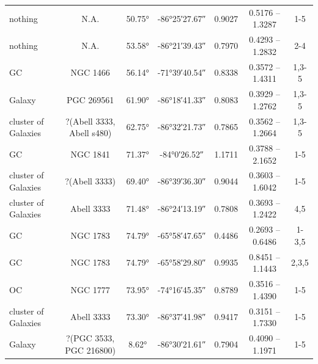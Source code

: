 \begin{longtable}{l c c c c c c}
    nothing             & N.A.                             & \ang{50.75} & \ang{-86;25;27.67} & 0.9027   & 0.5176 -- 1.3287 & 1-5         \\ %
    nothing             & N.A.                             & \ang{53.58} & \ang{-86;21;39.43} & 0.7970   & 0.4293 -- 1.2832 & 2-4         \\ %
    GC                  & NGC 1466                         & \ang{56.14} & \ang{-71;39;40.54} & 0.8338   & 0.3572 -- 1.4311 & 1,3-5       \\ %
    Galaxy              & PGC 269561                       & \ang{61.90} & \ang{-86;18;41.33} & 0.8083   & 0.3929 -- 1.2762 & 1,3-5       \\ %
    cluster of Galaxies & ?(Abell 3333, Abell s480)        & \ang{62.75} & \ang{-86;32;21.73} & 0.7865   & 0.3562 -- 1.2664 & 1,3-5       \\ %
    GC                  & NGC 1841                         & \ang{71.37} & \ang{-84;0;26.52}  & 1.1711   & 0.3788 -- 2.1652 & 1-5         \\ %
    cluster of Galaxies & ?(Abell 3333)                    & \ang{69.40} & \ang{-86;39;36.30} & 0.9044   & 0.3603 -- 1.6042 & 1-5         \\ %
    cluster of Galaxies & Abell 3333                       & \ang{71.48} & \ang{-86;24;13.19} & 0.7808   & 0.3693 -- 1.2422 & 4,5         \\ %
    GC                  & NGC 1783                         & \ang{74.79} & \ang{-65;58;47.65} & 0.4486   & 0.2693 -- 0.6486 & 1-3,5       \\ %
    GC                  & NGC 1783                         & \ang{74.79} & \ang{-65;58;29.80} & 0.9935   & 0.8451 -- 1.1443 & 2,3,5       \\ %
    OC                  & NGC 1777                         & \ang{73.95} & \ang{-74;16;45.35} & 0.8789   & 0.3516 -- 1.4390 & 1-5         \\ %
    cluster of Galaxies & Abell 3333                       & \ang{73.30} & \ang{-86;37;41.98} & 0.9417   & 0.3151 -- 1.7330 & 1-5         \\ %
    Galaxy              & ?(PGC 3533, PGC 216800)          & \ang{8.62}  & \ang{-86;30;21.61} & 0.7904   & 0.4090 -- 1.1971 & 1-5         \\ %
    \bottomrule
\end{longtable}

